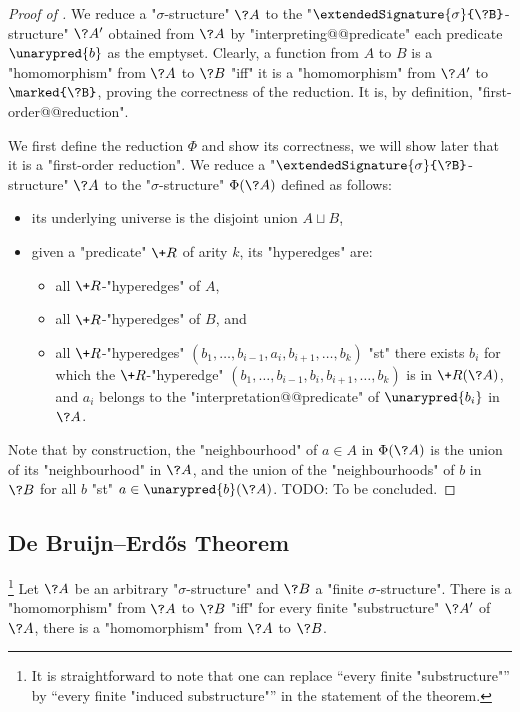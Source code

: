 \begin{proof}[Proof of ]
We reduce a "$\sigma$-structure" $\?A$ to the
"$\extendedSignature{\sigma}{\?B}$-structure" $\?A'$ obtained
from $\?A$ by "interpreting@@predicate" each predicate $\unarypred{b}$ as the emptyset.
Clearly, a function from $A$ to $B$ is a "homomorphism" from $\?A$ to $\?B$
"iff" it is a "homomorphism" from $\?A'$ to $\marked{\?B}$, proving the correctness
of the reduction. It is, by definition, "first-order@@reduction".

We first define the reduction $\Phi$ and show its correctness, we will show later that it
is a "first-order reduction". We reduce a "$\extendedSignature{\sigma}{\?B}$-structure" $\?A$ to the "$\sigma$-structure"
$\Phi(\?A)$ defined as follows:
\begin{itemize}
	\item its underlying universe is the disjoint union $A \sqcup B$,
	\item given a "predicate" $\+R$ of arity $k$, its "hyperedges" are:
	\begin{itemize}
	\item all $\+R$-"hyperedges" of $A$,
	\item all $\+R$-"hyperedges" of $B$, and
	\item all $\+R$-"hyperedges" $(b_1,\hdots,b_{i-1}, a_i, b_{i+1},\hdots,b_k)$
		"st" there exists $b_i$ for which the $\+R$-"hyperedge"
		$(b_1,\hdots,b_{i-1}, b_i, b_{i+1},\hdots,b_k)$
		is in $\+R(\?A)$, and $a_i$ belongs to the "interpretation@@predicate" of 
		$\unarypred{b_i}$ in $\?A$.
	\end{itemize}
\end{itemize}
Note that by construction, the "neighbourhood" of $a \in A$ in $\Phi(\?A)$ is
the union of its "neighbourhood" in $\?A$, and the union of the "neighbourhoods" of
$b$ in $\?B$ for all $b$ "st" $a \in \unarypred{b}(\?A)$.
TODO: To be concluded.  
\end{proof}

\subsection{De Bruijn–Erdős Theorem}

\begin{proposition}
	\!\footnote{It is straightforward to note that
	one can replace ``every finite "substructure"'' by
	``every finite "induced substructure"'' in the statement of the theorem.}%
	\AP\label{prop:de-bruijn-erdos}
	Let $\?A$ be an arbitrary "$\sigma$-structure" and $\?B$ a "finite $\sigma$-structure".
	There is a "homomorphism" from $\?A$ to $\?B$ "iff" for every finite "substructure" $\?A'$
	of $\?A$, there is a "homomorphism" from $\?A$ to $\?B$.
\end{proposition}

